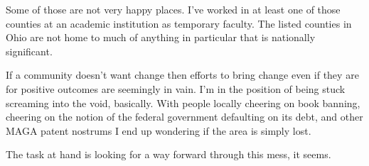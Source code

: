 Some of those are not very happy places. I've worked in at least one of
those counties at an academic institution as temporary faculty. The
listed counties in Ohio are not home to much of anything in particular
that is nationally significant.

If a community doesn't want change then efforts to bring change even if
they are for positive outcomes are seemingly in vain. I'm in the
position of being stuck screaming into the void, basically. With people
locally cheering on book banning, cheering on the notion of the federal
government defaulting on its debt, and other MAGA patent nostrums I end
up wondering if the area is simply lost.

The task at hand is looking for a way forward through this mess, it
seems.
